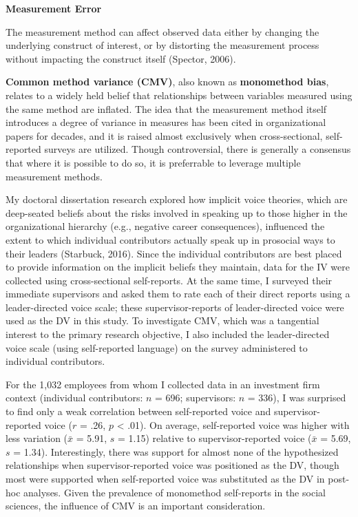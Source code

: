 \documentclass[]{book}
\begin{document}
\textbf{Measurement Error}

The measurement method can affect observed data either by changing the underlying construct of interest, or by distorting the measurement process without impacting the construct itself (Spector, 2006).

\textbf{Common method variance (CMV)}, also known as \textbf{monomethod bias}, relates to a widely held belief that relationships between variables measured using the same method are inflated. The idea that the measurement method itself introduces a degree of variance in measures has been cited in organizational papers for decades, and it is raised almost exclusively when cross-sectional, self-reported surveys are utilized. Though controversial, there is generally a consensus that where it is possible to do so, it is preferrable to leverage multiple measurement methods.

My doctoral dissertation research explored how implicit voice theories, which are deep-seated beliefs about the risks involved in speaking up to those higher in the organizational hierarchy (e.g., negative career consequences), influenced the extent to which individual contributors actually speak up in prosocial ways to their leaders (Starbuck, 2016). Since the individual contributors are best placed to provide information on the implicit beliefs they maintain, data for the IV were collected using cross-sectional self-reports. At the same time, I surveyed their immediate supervisors and asked them to rate each of their direct reports using a leader-directed voice scale; these supervisor-reports of leader-directed voice were used as the DV in this study. To investigate CMV, which was a tangential interest to the primary research objective, I also included the leader-directed voice scale (using self-reported language) on the survey administered to individual contributors.

For the 1,032 employees from whom I collected data in an investment firm context (individual contributors: \(n\) = 696; supervisors: \(n\) = 336), I was surprised to find only a weak correlation between self-reported voice and supervisor-reported voice (\(r\) = .26, \(p\) \textless{} .01). On average, self-reported voice was higher with less variation (\(\bar{x}\) = 5.91, \(s\) = 1.15) relative to supervisor-reported voice (\(\bar{x}\) = 5.69, \(s\) = 1.34). Interestingly, there was support for almost none of the hypothesized relationships when supervisor-reported voice was positioned as the DV, though most were supported when self-reported voice was substituted as the DV in post-hoc analyses. Given the prevalence of monomethod self-reports in the social sciences, the influence of CMV is an important consideration.
\end{document}
